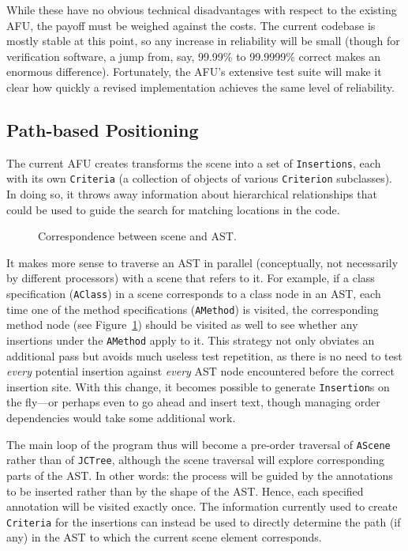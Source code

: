 \documentclass{article}
\begin{document}
While these have no obvious technical disadvantages with respect to the
existing AFU, the payoff must be weighed against the costs.  The current
codebase is mostly stable at this point, so any increase in reliability
will be small (though for verification software, a jump from, say,
99.99\% to 99.9999\% correct makes an enormous difference).
Fortunately, the AFU's extensive test suite will make it clear how
quickly a revised implementation achieves the same level of reliability.

\subsection{Path-based Positioning}

The current AFU creates transforms the scene into a set of
\texttt{Insertions}, each with its own \texttt{Criteria} (a collection
of objects of various \texttt{Criterion} subclasses).  In doing so, it
throws away information about hierarchical relationships that could be
used to guide the search for matching locations in the code.

\begin{figure}[ht]
\begin{center}
\end{center}
\caption{
Correspondence between scene and AST.
}
\label{fig:corresp}
\end{figure}

It makes more sense to traverse an AST in parallel (conceptually, not
necessarily by different processors) with a scene that refers to it.
For example, if a class specification (\texttt{AClass}) in a scene
corresponds to a class node in an AST, each time one of the method
specifications (\texttt{AMethod}) is visited, the corresponding method
node (see Figure~\ref{fig:corresp}) should be visited as well to see
whether any insertions under the \texttt{AMethod} apply to it.  This
strategy not only obviates an additional pass but avoids much useless
test repetition, as there is no need to test \emph{every} potential
insertion against \emph{every} AST node encountered before the correct
insertion site.  With this change, it becomes possible to generate
\texttt{Insertion}s on the fly---or perhaps even to go ahead and insert
text, though managing order dependencies would take some additional
work.

The main loop of the program thus will become a pre-order traversal of
\texttt{AScene} rather than of \texttt{JCTree}, although the scene
traversal will explore corresponding parts of the AST.  In other words:
the process will be guided by the annotations to be inserted rather than
by the shape of the AST.  Hence, each specified annotation will be
visited exactly once.  The information currently used to create
\texttt{Criteria} for the insertions can instead be used to directly
determine the path (if any) in the AST to which the current scene
element corresponds.
\end{document}
